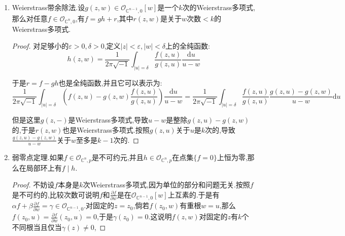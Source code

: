 \begin{enumerate}
\begin{proof}
		如果每个和$f$有关的自变量(换句话讲$f$对这个自变量的偏导数不为零)都是和$g$无关的自变量,那么明显的$f,g$的最大公约式是1,此时它们互素.于是我们不妨设自变量$z_n$和$f,g$都是有关的.此时不妨设$f,g$本身都是关于$z_n$的Weierstrass多项式,因为可逆的那一部分不影响这两个全纯函数的互素性.
		
		可取$\alpha,\beta\in\mathscr{O}_{\mathbb{C}^{n-1},0}[w]$使得$\alpha f+\beta g=\gamma\in\mathscr{O}_{\mathbb{C}^{n-1},0}$在足够小的$0$的开邻域上成立.现在设模长足够小的$z_0$满足$f(z_0)=g(z_0)=0$,并且$f,g$在$\mathscr{O}_{\mathbb{C}^n,z_0}$上具有公因子$h(z',z_n)$,于是$h\mid f,h\mid g$导致$h\mid\gamma$,这导致$h\in\mathscr{O}_{\mathbb{C}^{n-1},0}$.但是我们把$z_0$的前$n-1$个分量带入【】
	\end{proof}
	\item Weierstrass带余除法.设$g(z,w)\in\mathscr{O}_{\mathbb{C}^{n-1},0}[w]$是一个$k$次的Weierstrass多项式,那么对任意$f\in\mathscr{O}_{\mathbb{C}^n,0}$,有$f=gh+r$,其中$r(z,w)$是关于$w$次数$<k$的Weierstrass多项式.
	\begin{proof}
		
		对足够小的$\varepsilon>0,\delta>0$,定义$|z|<\varepsilon,|w|<\delta$上的全纯函数:
		$$h(z,w)=\frac{1}{2\pi\sqrt{-1}}\int_{|u|=\delta}\frac{f(z,u)}{g(z,u)}\frac{\mathrm{d}u}{u-w}$$
		
		于是$r=f-gh$也是全纯函数,并且它可以表示为:
		$$\frac{1}{2\pi\sqrt{-1}}\int_{|u|=\delta}\left(f(z,u)-g(z,w)\frac{f(z,u)}{g(z,u)}\right)\frac{\mathrm{d}u}{u-w}=\frac{1}{2\pi\sqrt{-1}}\int_{|u|=\delta}\frac{f(z,u)}{g(z,u)}\frac{g(z,u)-g(z,w)}{u-w}\mathrm{d}u$$
		
		但是这里$g(z,-)$是Weierstrass多项式,导致$u-w$是整除$g(z,u)-g(z,w)$的,于是$r(z,w)$也是Weierstrass多项式.按照$g(z,u)$关于$u$是$k$次的,导致$\frac{g(z,u)-g(z,w)}{u-w}$关于$w$至多是$k-1$次的.
	\end{proof}
	\item  弱零点定理.如果$f\in\mathscr{O}_{\mathbb{C}^n,p}$是不可约元,并且$h\in\mathscr{O}_{\mathbb{C}^n,p}$在点集$\{f=0\}$上恒为零,那么在局部环上有$f\mid h$.
	\begin{proof}
		
		不妨设$f$本身是$k$次Weierstrass多项式,因为单位的部分和问题无关.按照$f$是不可约的,比较次数可说明$f$和$\frac{\partial f}{\partial w}$是在$\mathscr{O}_{\mathbb{C}^{n-1},0}[w]$上互素的.于是有$\alpha f+\beta\frac{\partial f}{\partial w}=\gamma\in\mathscr{O}_{\mathbb{C}^{n-1},0}$.对固定的$z=z_0$,倘若$f(z_0,w)$有重根$w=u$,那么$f(z_0,u)=\frac{\partial f}{\partial w}(z_0,u)=0$,于是$\gamma(z_0)=0$.这说明$f(z,w)$对固定的$z$有$k$个不同根当且仅当$\gamma(z)\not=0$,
		

\end{proof}
\end{enumerate}
